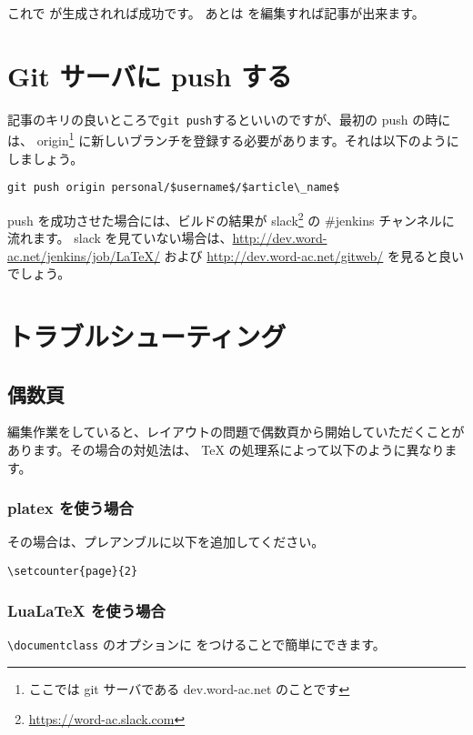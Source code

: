 これで が生成されれば成功です。
あとは を編集すれば記事が出来ます。

\section{Git サーバに push する}

記事のキリの良いところで\lstinline|git push|するといいのですが、最初の push の時には、
origin\footnote{ここでは git サーバである dev.word-ac.net のことです}
に新しいブランチを登録する必要があります。それは以下のようにしましょう。

\begin{lstlisting}[mathescape]
git push origin personal/$username$/$article\_name$
\end{lstlisting}

push を成功させた場合には、ビルドの結果が slack\footnote{\url{https://word-ac.slack.com}} の \#jenkins チャンネルに流れます。
slack を見ていない場合は、\url{http://dev.word-ac.net/jenkins/job/LaTeX/} および \url{http://dev.word-ac.net/gitweb/} を見ると良いでしょう。

\section{トラブルシューティング}

\subsection{偶数頁}

編集作業をしていると、レイアウトの問題で偶数頁から開始していただくことがあります。その場合の対処法は、 TeX の処理系によって以下のように異なります。

\subsubsection{platex を使う場合}

その場合は、プレアンブルに以下を追加してください。

\begin{lstlisting}[mathescape]
\setcounter{page}{2}
\end{lstlisting}

\subsubsection{LuaLaTeX を使う場合}

\lstinline|\documentclass| のオプションに  をつけることで簡単にできます。

